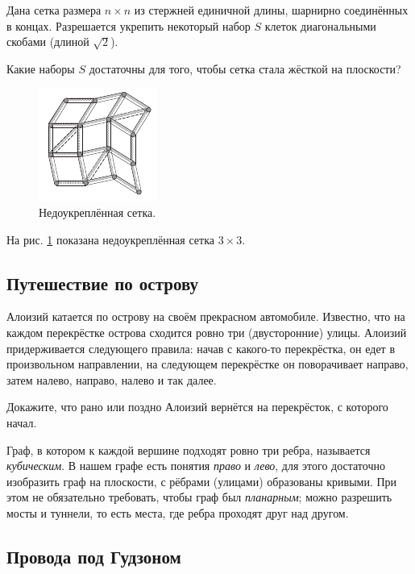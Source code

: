Дана сетка размера $n \times n$ из стержней единичной длины, шарнирно соединённых в концах.
Разрешается укрепить некоторый набор $S$ клеток диагональными скобами (длиной $\sqrt{2}$).

Какие наборы $S$ достаточны для того, чтобы сетка стала жёсткой на плоскости?

\begin{figure}[ht!]
\centering
\includegraphics[scale=1]{pics/lattice1}
\caption{Недоукреплённая сетка.}
\label{pic:lattice1}
\end{figure}

На рис. \ref{pic:lattice1} показана недоукреплённая сетка $3 \times 3$.

\subsection*{Путешествие по острову}

Алоизий катается по острову на своём прекрасном автомобиле.
Известно, что на каждом перекрёстке острова сходится ровно три (двусторонние) улицы.
Алоизий придерживается следующего правила:
начав с какого-то перекрёстка, он едет в произвольном направлении, на следующем перекрёстке он поворачивает направо, затем налево,
направо,
налево
и так далее.

Докажите, что рано или поздно Алоизий вернётся на перекрёсток, с которого начал.

Граф, в котором к каждой вершине подходят ровно три ребра, называется \emph{кубическим}.
В нашем графе есть понятия \emph{право} и \emph{лево},
для этого достаточно изобразить граф на плоскости, с рёбрами (улицами) образованы кривыми.
При этом не обязательно требовать, чтобы граф был \emph{планарным};
можно разрешить мосты и туннели, то есть места, где ребра проходят друг над другом.

\subsection*{Провода под Гудзоном}

